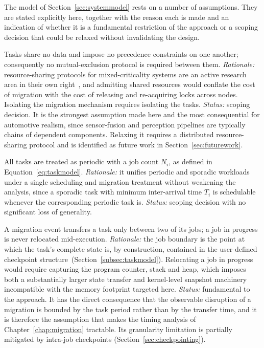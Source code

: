 The model of Section~\ref{sec:systemmodel} rests on a number of assumptions.
They are stated explicitly here, together with the reason each is made and an
indication of whether it is a fundamental restriction of the approach or a
scoping decision that could be relaxed without invalidating the design.

\begin{description}
	
	Tasks share no data and impose no precedence constraints on one another;
	consequently no mutual-exclusion protocol is required between them.
	\emph{Rationale:} resource-sharing protocols for mixed-criticality systems
	are an active research area in their own
	right~\parencite{burns2017}, and admitting shared resources would
	conflate the cost of migration with the cost of releasing and re-acquiring
	locks across nodes. Isolating the migration mechanism requires isolating
	the tasks.
	\emph{Status:} scoping decision. It is the strongest assumption made here
	and the most consequential for automotive realism, since sensor-fusion and
	perception pipelines are typically chains of dependent components. Relaxing
	it requires a distributed resource-sharing protocol and is identified as
	future work in Section~\ref{sec:futurework}.
	
	All tasks are treated as periodic with a job count $N_i$, as defined in
	Equation~\ref{eq:taskmodel}.
	\emph{Rationale:} it unifies periodic and sporadic workloads under a single
	scheduling and migration treatment without weakening the analysis, since
	a sporadic task with minimum inter-arrival time $T_i$ is schedulable
	whenever the corresponding periodic task is.
	\emph{Status:} scoping decision with no significant loss of generality.
	
	A migration event transfers a task only between two of its jobs; a job in
	progress is never relocated mid-execution.
	\emph{Rationale:} the job boundary is the point at which the task's
	complete state is, by construction, contained in the user-defined
	checkpoint structure~(Section~\ref{subsec:taskmodel}). Relocating a job in
	progress would require capturing the program counter, stack and heap, which
	imposes both a substantially larger state transfer and kernel-level
	snapshot machinery incompatible with the memory footprint targeted here.
	\emph{Status:} fundamental to the approach. It has the direct consequence
	that the observable disruption of a migration is bounded by the task period
	rather than by the transfer time, and it is therefore the assumption that
	makes the timing analysis of Chapter~\ref{chap:migration} tractable. Its
	granularity limitation is partially mitigated by intra-job checkpoints
	(Section~\ref{sec:checkpointing}).
	

\end{description}
